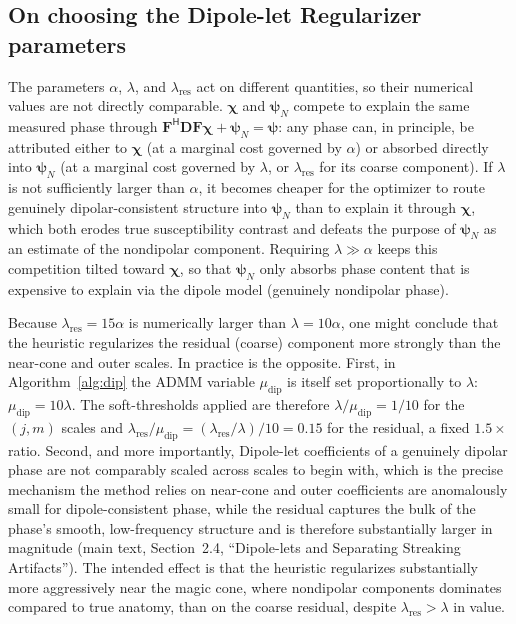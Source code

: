 \documentclass{article}
\begin{document}
\newpage
\subsection{On choosing the Dipole-let Regularizer parameters}
The parameters $\alpha$, $\lambda$, and $\lambda_{\text{res}}$ act on different quantities, so their numerical values are not directly comparable. $\bm{\chi}$ and $\bm{\psi}_N$ compete to explain the same measured phase through $\mathbf{F}^{\mathsf{H}}\mathbf{D}\mathbf{F}\bm{\chi}+\bm{\psi}_N=\bm{\psi}$: any phase can, in principle, be attributed either to $\bm{\chi}$ (at a marginal cost governed by $\alpha$) or absorbed directly into $\bm{\psi}_N$ (at a marginal cost governed by $\lambda$, or $\lambda_{\text{res}}$ for its coarse component). If $\lambda$ is not sufficiently larger than $\alpha$, it becomes cheaper for the optimizer to route genuinely dipolar-consistent structure into $\bm{\psi}_N$ than to explain it through $\bm{\chi}$, which both erodes true susceptibility contrast and defeats the purpose of $\bm{\psi}_N$ as an estimate of the nondipolar component. Requiring $\lambda \gg \alpha$ keeps this competition tilted toward $\bm{\chi}$, so that $\bm{\psi}_N$ only absorbs phase content that is expensive to explain via the dipole model (genuinely nondipolar phase).

 Because $\lambda_{\text{res}}=15\alpha$ is numerically larger than $\lambda=10\alpha$, one might conclude that the heuristic regularizes the residual (coarse) component more strongly than the near-cone and outer scales. In practice is the opposite. First, in Algorithm~\ref{alg:dip} the ADMM variable $\mu_{\text{dip}}$ is itself set proportionally to $\lambda$: $\mu_{\text{dip}}=10\lambda$. The soft-thresholds applied are therefore $\lambda/\mu_{\text{dip}}=1/10$ for the $(j,m)$ scales and $\lambda_{\text{res}}/\mu_{\text{dip}}=(\lambda_{\text{res}}/\lambda)/10=0.15$ for the residual, a fixed $1.5\times$ ratio. Second, and more importantly, Dipole-let coefficients of a genuinely dipolar phase are not comparably scaled across scales to begin with, which is the precise mechanism the method relies on near-cone and outer coefficients are anomalously small for dipole-consistent phase, while the residual captures the bulk of the phase's smooth, low-frequency structure and is therefore substantially larger in magnitude  (main text, Section~2.4, ``Dipole-lets and Separating Streaking Artifacts''). The intended effect is that the heuristic regularizes substantially more aggressively near the magic cone, where nondipolar components dominates compared to true anatomy, than on the coarse residual, despite $\lambda_{\text{res}}>\lambda$ in  value.
\end{document}
